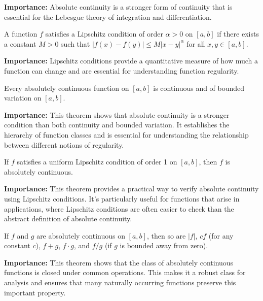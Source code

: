 \noindent\textbf{Importance:} Absolute continuity is a stronger form of continuity that is essential for the Lebesgue theory of integration and differentiation.

\begin{definition}
A function $f$ satisfies a Lipschitz condition of order $\alpha > 0$ on $[a, b]$ if there exists a constant $M > 0$ such that $|f(x) - f(y)| \leq M |x - y|^\alpha$ for all $x, y \in [a, b]$.
\end{definition}

\noindent\textbf{Importance:} Lipschitz conditions provide a quantitative measure of how much a function can change and are essential for understanding function regularity.

\begin{theorem}
Every absolutely continuous function on $[a, b]$ is continuous and of bounded variation on $[a, b]$.
\end{theorem}

\noindent\textbf{Importance:} This theorem shows that absolute continuity is a stronger condition than both continuity and bounded variation. It establishes the hierarchy of function classes and is essential for understanding the relationship between different notions of regularity.



\begin{theorem}
If $f$ satisfies a uniform Lipschitz condition of order 1 on $[a, b]$, then $f$ is absolutely continuous.
\end{theorem}

\noindent\textbf{Importance:} This theorem provides a practical way to verify absolute continuity using Lipschitz conditions. It's particularly useful for functions that arise in applications, where Lipschitz conditions are often easier to check than the abstract definition of absolute continuity.



\begin{theorem}
If $f$ and $g$ are absolutely continuous on $[a, b]$, then so are $|f|$, $cf$ (for any constant $c$), $f + g$, $f \cdot g$, and $f/g$ (if $g$ is bounded away from zero).
\end{theorem}

\noindent\textbf{Importance:} This theorem shows that the class of absolutely continuous functions is closed under common operations. This makes it a robust class for analysis and ensures that many naturally occurring functions preserve this important property.





